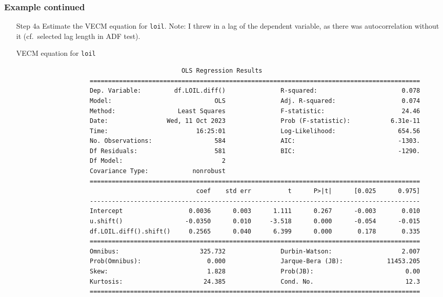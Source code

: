 \begin{frame}[fragile]\frametitle{Example continued}
\begin{itemize}
\item[Step 4a] Estimate the VECM equation for \texttt{loil}. Note: I threw in a lag of the dependent variable, as there was autocorrelation without it (cf.\ selected lag length in ADF test).
\begin{block}{VECM equation for \texttt{loil}}
	\tiny
\begin{verbatim}
                                             OLS Regression Results                            
                    ==========================================================================================
                    Dep. Variable:         df.LOIL.diff()               R-squared:                       0.078
                    Model:                            OLS               Adj. R-squared:                  0.074
                    Method:                 Least Squares               F-statistic:                     24.46
                    Date:                Wed, 11 Oct 2023               Prob (F-statistic):           6.31e-11
                    Time:                        16:25:01               Log-Likelihood:                 654.56
                    No. Observations:                 584               AIC:                            -1303.
                    Df Residuals:                     581               BIC:                            -1290.
                    Df Model:                           2                                         
                    Covariance Type:            nonrobust                                         
                    ==========================================================================================
                                                 coef    std err          t      P>|t|      [0.025      0.975]
                    ------------------------------------------------------------------------------------------
                    Intercept                  0.0036      0.003      1.111      0.267      -0.003       0.010
                    u.shift()                 -0.0350      0.010     -3.518      0.000      -0.054      -0.015
                    df.LOIL.diff().shift()     0.2565      0.040      6.399      0.000       0.178       0.335
                    ==========================================================================================
                    Omnibus:                      325.732               Durbin-Watson:                   2.007
                    Prob(Omnibus):                  0.000               Jarque-Bera (JB):            11453.205
                    Skew:                           1.828               Prob(JB):                         0.00
                    Kurtosis:                      24.385               Cond. No.                         12.3
                    ==========================================================================================

\end{verbatim}
\end{block}
\end{itemize}
\end{frame}
